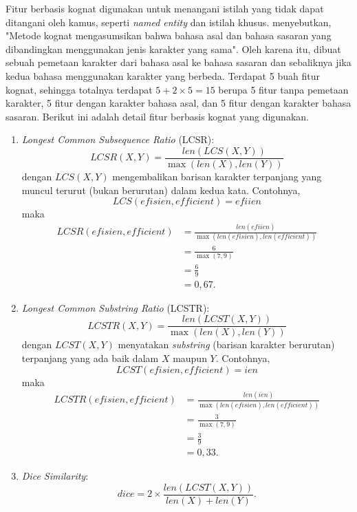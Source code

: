 \documentclass[../main/main.tex]{subfiles}
\begin{document}
Fitur berbasis kognat digunakan untuk menangani istilah yang tidak dapat ditangani oleh kamus, seperti \textit{named entity} dan istilah khusus. \textcite{aker} menyebutkan, "Metode kognat mengasumsikan bahwa bahasa asal dan bahasa sasaran yang dibandingkan menggunakan jenis karakter yang sama". Oleh karena itu, dibuat sebuah pemetaan karakter dari bahasa asal ke bahasa sasaran dan sebaliknya jika kedua bahasa menggunakan karakter yang berbeda. Terdapat 5 buah fitur kognat, sehingga totalnya terdapat $5 + 2 \times 5 = 15$ berupa 5 fitur tanpa pemetaan karakter, 5 fitur dengan karakter bahasa asal, dan 5 fitur dengan karakter bahasa sasaran. Berikut ini adalah detail fitur berbasis kognat yang digunakan.
\begin{enumerate}
\item \textit{Longest Common Subsequence Ratio} (LCSR):
\begin{equation}
	LCSR(X,Y) = \frac{len(LCS(X,Y))}{\max(len(X), len(Y))}
\end{equation}
dengan $LCS(X,Y)$ mengembalikan barisan karakter terpanjang yang muncul terurut (bukan berurutan) dalam kedua kata. Contohnya, \[ LCS(efisien,efficient) = efiien \] maka
\[
	\begin{aligned}
		LCSR(efisien,efficient) &= \frac{len(efiien)}{\max(len(efisien), len(efficient))}\\
		&= \frac{6}{\max(7,9)}\\
		&= \frac{6}{9}\\
		&= 0,67.
	\end{aligned}
\]
\item \textit{Longest Common Substring Ratio} (LCSTR):
\begin{equation}
	LCSTR(X,Y) = \frac{len(LCST(X,Y))}{\max(len(X), len(Y))}
\end{equation}
dengan $LCST(X,Y)$ menyatakan \textit{substring} (barisan karakter berurutan) terpanjang yang ada baik dalam $X$ maupun $Y$. Contohnya, \[ LCST(efisien,efficient) = ien \] maka
\[
	\begin{aligned}
		LCSTR(efisien,efficient) &= \frac{len(ien)}{\max(len(efisien), len(efficient))}\\
		&= \frac{3}{\max(7,9)}\\
		&= \frac{3}{9}\\
		&= 0,33.
	\end{aligned}
\]
\item \textit{Dice Similarity}:
\begin{equation}
	dice = 2 \times \frac{len(LCST(X,Y))}{len(X) + len(Y)}.
\end{equation}

\end{enumerate}
\end{document}
